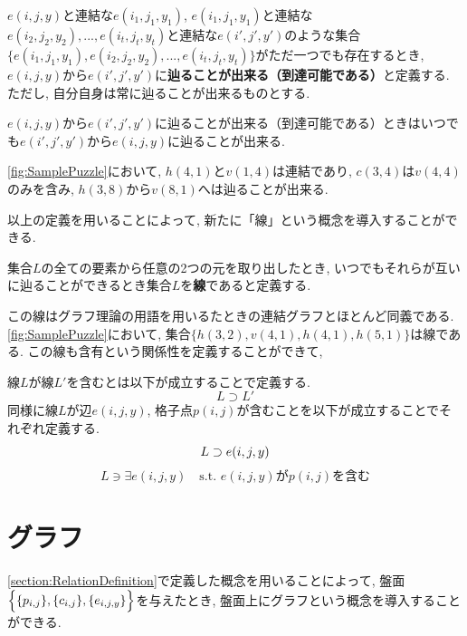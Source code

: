 \begin{definition}[到達可能]
  $e(i,j,y)$と連結な$e(i_1,j_1,y_1)$, $e(i_1,j_1,y_1)$と連結な$e(i_2,j_2,y_2),...,e(i_t,j_t,y_t)$と連結な$e(i',j',y')$のような集合$\{e(i_1,j_1,y_1),e(i_2,j_2,y_2),...,e(i_t,j_t,y_t)\}$がただ一つでも存在するとき, $e(i,j,y)$から$e(i',j',y')$に\textbf{辿ることが出来る（到達可能である）}と定義する. ただし, 自分自身は常に辿ることが出来るものとする.
\end{definition}

\begin{remark}
  $e(i,j,y)$から$e(i',j',y')$に辿ることが出来る（到達可能である）ときはいつでも$e(i',j',y')$から$e(i,j,y)$に辿ることが出来る.
\end{remark}

\begin{example}[連結, 含有, 到達可能]
  \cref{fig:SamplePuzzle}において, $h(4,1)$と$v(1,4)$は連結であり, $c(3,4)$は$v(4,4)$のみを含み, $h(3,8)$から$v(8,1)$へは辿ることが出来る.
\end{example}
以上の定義を用いることによって, 新たに「線」という概念を導入することができる.

\begin{definition}[線]\label{definition:Line}
  集合$L$の全ての要素から任意の2つの元を取り出したとき, いつでもそれらが互いに辿ることができるとき集合$L$を\textbf{線}であると定義する.
\end{definition}
この線はグラフ理論の用語を用いるたときの連結グラフとほとんど同義である. \cref{fig:SamplePuzzle}において, 集合$\{h(3,2),v(4,1),h(4,1),h(5,1)\}$は線である. この線も含有という関係性を定義することができて,
\begin{definition}[線の含有]
  線$L$が線$L'$を含むとは以下が成立することで定義する.
  \begin{equation*}
    L\supset L'
  \end{equation*}
  同様に線$L$が辺$e(i,j,y)$, 格子点$p(i,j)$が含むことを以下が成立することでそれぞれ定義する.
  \begin{equation*}
    L\supset  e(i,j,y) \\
  \end{equation*}
  \begin{equation*}
    L\ni \exists e(i,j,y) \quad \mbox{s.t. $e(i,j,y)$が$p(i,j)$を含む}
  \end{equation*}
\end{definition}

\section{グラフ}\label{section:GraphDefinition}
\cref{section:RelationDefinition}で定義した概念を用いることによって, 盤面$\Bigl\{\{p_{i,j}\},\{c_{i,j}\},\{e_{i,j,y}\}\Bigr\}$を与えたとき, 盤面上にグラフという概念を導入することができる.

